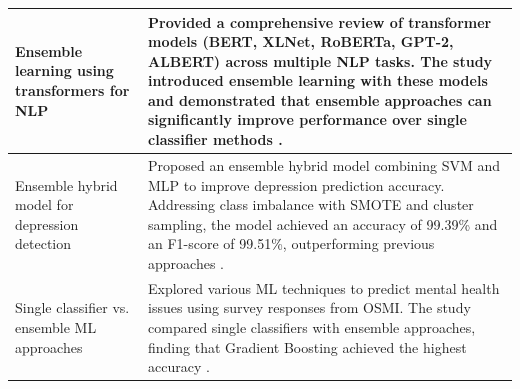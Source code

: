 \begin{table}[H]
\begin{tabularx}{\textwidth}{|p{3.5cm}|X|}
    Ensemble learning using transformers for NLP & Provided a comprehensive review of transformer models (BERT, XLNet, RoBERTa, GPT-2, ALBERT) across multiple NLP tasks. The study introduced ensemble learning with these models and demonstrated that ensemble approaches can significantly improve performance over single classifier methods \cite{Zhang_2024}. \\ \hline
    Ensemble hybrid model for depression detection & Proposed an ensemble hybrid model combining SVM and MLP to improve depression prediction accuracy. Addressing class imbalance with SMOTE and cluster sampling, the model achieved an accuracy of 99.39\% and an F1-score of 99.51\%, outperforming previous approaches \cite{Saha2024}. \\ \hline
    Single classifier vs. ensemble ML approaches & Explored various ML techniques to predict mental health issues using survey responses from OSMI. The study compared single classifiers with ensemble approaches, finding that Gradient Boosting achieved the highest accuracy \cite{Chung_2023}. 
    \\ \hline
\end{tabularx}
\end{table}




